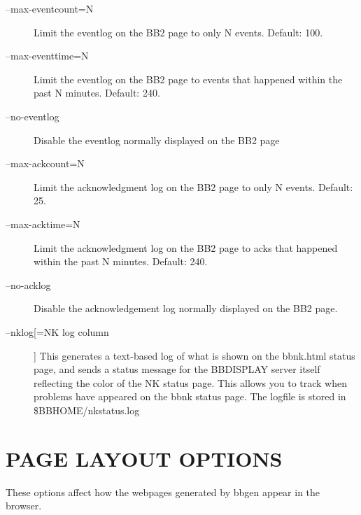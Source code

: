 \begin{description}
 

\item[--max-eventcount=N] Limit the eventlog on the BB2 page to only N
  events. Default: 100. 


 

\item[--max-eventtime=N] Limit the eventlog on the BB2 page to events
  that happened within the past N minutes. Default: 240. 


 

\item[--no-eventlog] Disable the eventlog normally displayed on the BB2 page 

 

\item[--max-ackcount=N] Limit the acknowledgment log on the BB2 page to only N events. Default: 25. 

 

\item[--max-acktime=N] Limit the acknowledgment log on the BB2 page to acks that happened within the past N minutes. Default: 240. 

 

\item[--no-acklog] Disable the acknowledgement log normally displayed on the BB2 page. 

 

\item[--nklog[=NK log column]] This generates a text-based log of what
  is shown on the bbnk.html status page, and sends a status message
  for the BBDISPLAY server itself reflecting the color of the NK
  status page. This allows you to track when problems have appeared on
  the bbnk status page. The logfile is stored in \$BBHOME/nkstatus.log 



 


\end{description}

\section{PAGE LAYOUT OPTIONS}
 These options affect how the webpages generated by bbgen appear in the browser. 

